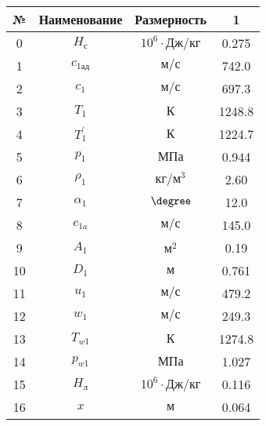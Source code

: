 \begin{center}
    \begin{longtable}{|c|c|c|c|}
        \hline
        \textbf{№} &
        \textbf{Наименование} &
        \textbf{Размерность} &
        \textbf{1} \\\hline
        \endhead
        
        0 & $H_с$ & $10^6 \cdot Дж/кг$ & 0.275 \\\hline
        
        1 & $c_{1ад}$ & $м/с$ & 742.0 \\\hline
        
        2 & $c_{1}$ & $м/с$ & 697.3 \\\hline
        
        3 & $T_1$ & $К$ & 1248.8 \\\hline
        
        4 & $T_1^\prime$ & $К$ & 1224.7 \\\hline
        
        5 & $p_1$ & $МПа$ & 0.944 \\\hline
        
        6 & $\rho_1$ & $кг/м^3$ & 2.60 \\\hline
        
        7 & $\alpha_1$ & $\degree$ & 12.0 \\\hline
        
        8 & $c_{1a}$ & $м/с$ & 145.0 \\\hline
        
        9 & $A_1$ & $м^2$ & 0.19 \\\hline
        
        10 & $D_1$ & $м$ & 0.761 \\\hline
        
        11 & $u_1$ & $м/с$ & 479.2 \\\hline
        
        12 & $w_1$ & $м/с$ & 249.3 \\\hline
        
        13 & $T_{w1}$ & $К$ & 1274.8 \\\hline
        
        14 & $p_{w1}$ & $МПа$ & 1.027 \\\hline
        
        15 & $H_л$ & $10^6 \cdot Дж/кг$ & 0.116 \\\hline
        
        16 & $x$ & $м$ & 0.064 \\\hline
        

\end{longtable}
\end{center}
